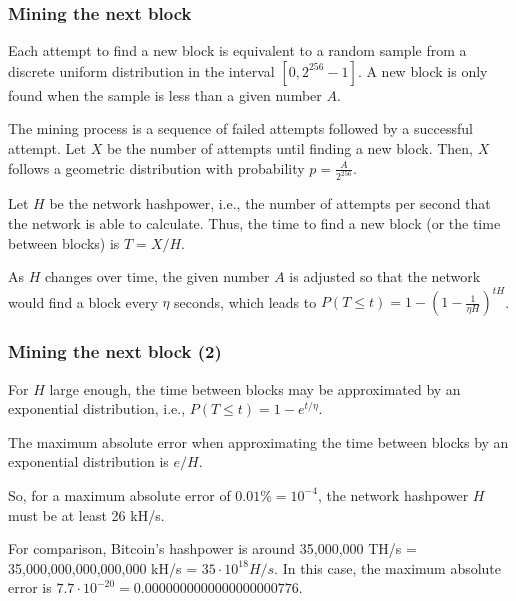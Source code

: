 \documentclass{beamer}
\begin{document}
\begin{frame}
\frametitle{Mining the next block}

Each attempt to find a new block is equivalent to a random sample from a discrete uniform distribution in the interval $[0, 2^{256}-1]$. A new block is only found when the sample is less than a given number $A$.

The mining process is a sequence of failed attempts followed by a successful attempt. Let $X$ be the number of attempts until finding a new block. Then, $X$ follows a geometric distribution with probability $p = \frac{A}{2^{256}}$.

Let $H$ be the network hashpower, i.e., the number of attempts per second that the network is able to calculate. Thus, the time to find a new block (or the time between blocks) is $T = X/H$.

As $H$ changes over time, the given number $A$ is adjusted so that the network would find a block every $\eta$ seconds, which leads to $P(T \le t) = 1 - \left(1 - \frac{1}{\eta H} \right)^{tH}$.
\end{frame}


\begin{frame}
\frametitle{Mining the next block (2)}

\begin{theorem}
    For $H$ large enough, the time between blocks may be approximated by an exponential distribution, i.e., $P(T \le t) = 1 - e^{t/\eta}$.
\end{theorem}

\begin{theorem}
	The maximum absolute error when approximating the time between blocks by an exponential distribution is $e / H$.
\end{theorem}

So, for a maximum absolute error of $0.01 \% = 10^{-4}$, the network hashpower $H$ must be at least 26 kH/s.

For comparison, Bitcoin's hashpower is around 35,000,000 TH/s = 35,000,000,000,000,000 kH/s = $35 \cdot 10^{18} H/s$. In this case, the maximum absolute error is $7.7 \cdot 10^{-20} = 0.0000000000000000000776$.

\end{frame}
\end{document}
